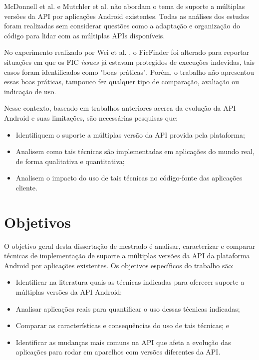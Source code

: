 McDonnell et al. \cite{McDonnell2013} e Mutchler et al. \cite{Mutchler2016}
não abordam o tema de suporte a múltiplas versões da API
por aplicações Android existentes. Todas as análises dos estudos foram
realizadas sem considerar questões como a adaptação e organização do código para
lidar com as múltiplas APIs disponíveis.

No experimento realizado por Wei et al. \cite{Wei2016}, o FicFinder foi
alterado para reportar situações em que os FIC \textit{issues} já estavam protegidos
de execuções indevidas, tais casos foram identificados como "boas práticas". Porém,
o trabalho não apresentou essas boas práticas, tampouco fez qualquer tipo de
comparação, avaliação ou indicação de uso.

Nesse contexto, baseado em trabalhos anteriores acerca da evolução da API Android
e suas limitações, são necessárias pesquisas que:
\begin{itemize}
    \item Identifiquem o suporte a múltiplas versão da API provida pela plataforma;
    \item Analisem como tais técnicas são implementadas em aplicações do mundo
        real, de forma qualitativa e quantitativa;
    \item Analisem o impacto do uso de tais técnicas no código-fonte das aplicações
        cliente.   
\end{itemize}

\section{Objetivos} \label{sec:objetivos-gerais-especificos}

O objetivo geral desta dissertação de mestrado é analisar, caracterizar e comparar
técnicas de implementação de suporte a múltiplas versões da API da plataforma
Android por aplicações existentes. Os objetivos específicos do trabalho são:
\begin{itemize}
	\item Identificar na literatura quais as técnicas indicadas para oferecer suporte
	a múltiplas versões da API Android;
	\item Analisar aplicações reais para quantificar o uso dessas técnicas indicadas;
	\item Comparar as características e consequências do uso de tais técnicas; e
	\item Identificar as mudanças mais comuns na API que afeta a evolução das
	aplicações para rodar em aparelhos com versões diferentes da API.
\end{itemize}

